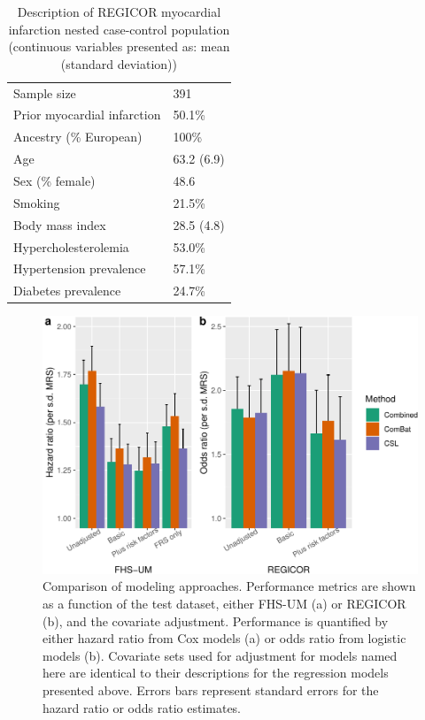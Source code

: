\documentclass[]{article}
\begin{document}
\begin{longtable}[t]{ll}
\caption{\label{tab:regicor-description}Description of REGICOR myocardial infarction nested case-control population (continuous variables presented as: mean (standard deviation))}\\
\toprule
Sample size & 391\\
Prior myocardial infarction & 50.1\%\\
Ancestry (\% European) & 100\%\\
Age & 63.2 (6.9)\\
Sex (\% female) & 48.6\\
Smoking & 21.5\%\\
Body mass index & 28.5 (4.8)\\
Hypercholesterolemia & 53.0\%\\
Hypertension prevalence & 57.1\%\\
Diabetes prevalence & 24.7\%\\
\bottomrule
\end{longtable}

\newpage

\begin{figure}[h]
\includegraphics{figures/csl-comparison-1} \caption{Comparison of modeling approaches. Performance metrics are shown as a function of the test dataset, either FHS-UM (a) or REGICOR (b), and the covariate adjustment. Performance is quantified by either hazard ratio from Cox models (a) or odds ratio from logistic models (b). Covariate sets used for adjustment for models named here are identical to their descriptions for the regression models presented above. Errors bars represent standard errors for the hazard ratio or odds ratio estimates.}\label{fig:csl-comparison}
\end{figure}
\end{document}
